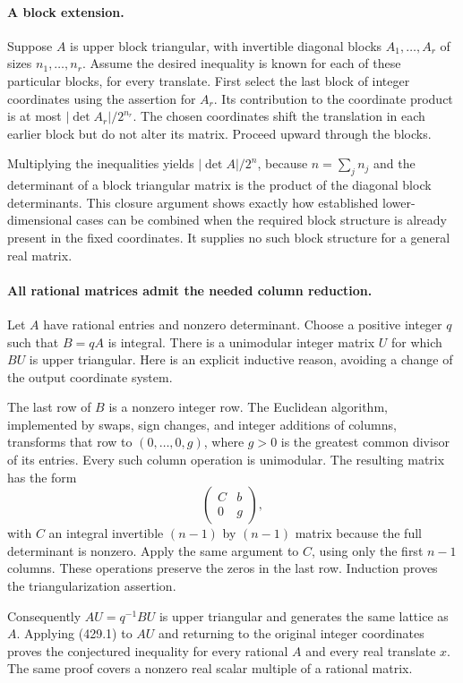 \documentclass[11pt]{article}
\begin{document}
\paragraph{A block extension.}
Suppose $A$ is upper block triangular, with invertible diagonal blocks $A_1,\ldots,A_r$ of sizes $n_1,\ldots,n_r$. Assume the desired inequality is known for each of these particular blocks, for every translate. First select the last block of integer coordinates using the assertion for $A_r$. Its contribution to the coordinate product is at most $|\det A_r|/2^{n_r}$. The chosen coordinates shift the translation in each earlier block but do not alter its matrix. Proceed upward through the blocks.

Multiplying the inequalities yields $|\det A|/2^n$, because $n=\sum_jn_j$ and the determinant of a block triangular matrix is the product of the diagonal block determinants. This closure argument shows exactly how established lower-dimensional cases can be combined when the required block structure is already present in the fixed coordinates. It supplies no such block structure for a general real matrix.

\paragraph{All rational matrices admit the needed column reduction.}
Let $A$ have rational entries and nonzero determinant. Choose a positive integer $q$ such that $B=qA$ is integral. There is a unimodular integer matrix $U$ for which $BU$ is upper triangular. Here is an explicit inductive reason, avoiding a change of the output coordinate system.

The last row of $B$ is a nonzero integer row. The Euclidean algorithm, implemented by swaps, sign changes, and integer additions of columns, transforms that row to $(0,\ldots,0,g)$, where $g>0$ is the greatest common divisor of its entries. Every such column operation is unimodular. The resulting matrix has the form
\[
 \begin{pmatrix}C&b\\0&g\end{pmatrix},
\]
with $C$ an integral invertible $(n-1)$ by $(n-1)$ matrix because the full determinant is nonzero. Apply the same argument to $C$, using only the first $n-1$ columns. These operations preserve the zeros in the last row. Induction proves the triangularization assertion.

Consequently $AU=q^{-1}BU$ is upper triangular and generates the same lattice as $A$. Applying (429.1) to $AU$ and returning to the original integer coordinates proves the conjectured inequality for every rational $A$ and every real translate $x$. The same proof covers a nonzero real scalar multiple of a rational matrix.
\end{document}
